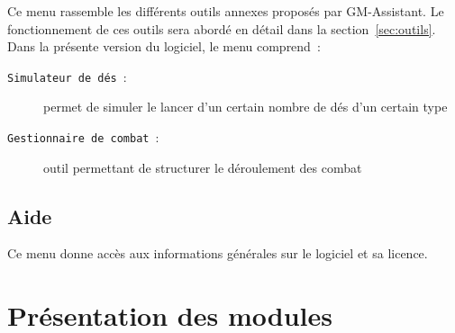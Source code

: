 \documentclass[a4paper,12pt]{article}
\newcommand*{\GMA}{GM-Assistant\xspace}
\newcommand*{\interfaceitem}[1]{\texttt{#1}}
\begin{document}
Ce menu rassemble les différents outils annexes proposés par \GMA.
Le fonctionnement de ces outils sera abordé en détail dans la section~\ref{sec:outils}.
Dans la présente version du logiciel, le menu comprend~:
\begin{description}
    \item[\interfaceitem{Simulateur de dés}~:]{permet de simuler le lancer d'un certain nombre de dés d'un certain type}
    \item[\interfaceitem{Gestionnaire de combat}~:]{outil permettant de structurer le déroulement des combat}
\end{description}

\subsection{Aide}
\label{sec:aide}

Ce menu donne accès aux informations générales sur le logiciel et sa licence.

\section{Présentation des modules}
\label{sec:modules}
\end{document}
